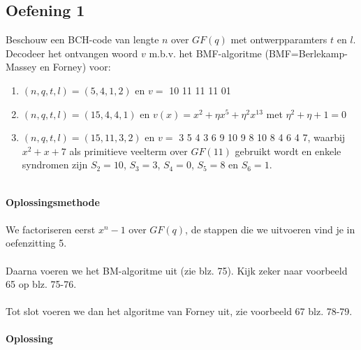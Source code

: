 \documentclass[11pt,a4paper,titlepage]{article}
\begin{document}
\subsection{Oefening 1}
Beschouw een BCH-code van lengte $n$ over $GF(q)$ met ontwerpparamters $t$ en $l$. Decodeer het ontvangen woord $v$ m.b.v. het BMF-algoritme (BMF=Berlekamp-Massey en Forney) voor:
\begin{enumerate}[label=(\alph*)]
	\item $(n,q,t,l) = (5,4,1,2)$ en $v=$ 10 11 11 11 01
	\item $(n,q,t,l) = (15,4,4,1)$ en $v(x) = x^2 + \eta x^5 + \eta^2 x^{13}$ met $\eta^2 + \eta + 1 = 0$
	\item $(n,q,t,l) = (15,11,3,2)$ en $v=$ 3 5 4 3 6 9 10 9 8 10 8 4 6 4 7, waarbij $x^2 + x + 7$ als primitieve veelterm over $GF(11)$ gebruikt wordt en enkele syndromen zijn $S_2 = 10$, $S_3 = 3$, $S_4 = 0$, $S_5 = 8$ en $S_6 = 1$.
\end{enumerate}
\noindent \\ \textbf{Oplossingsmethode} \\ \\
We factoriseren eerst $x^n - 1$ over $GF(q)$, de stappen die we uitvoeren vind je in oefenzitting 5. \\ \\
Daarna voeren we het BM-algoritme uit (zie blz. 75). Kijk zeker naar voorbeeld 65 op blz. 75-76.\\ \\
Tot slot voeren we dan het algoritme van Forney uit, zie voorbeeld 67 blz. 78-79.
\\ \\ \textbf{Oplossing}
\end{document}
